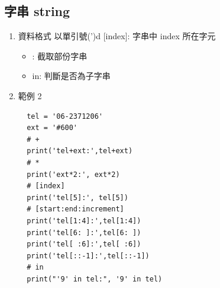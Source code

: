 \documentclass[a4paper,12pt]{article}
\begin{document}
\subsection{字串 string}
\label{sec:orga0fc341}
\begin{enumerate}
\item 資料格式
\label{sec:org3f5cb00}
以單引號(')d [index]: 字串中 index 所在字元\\
\begin{itemize}
\item{}: 截取部份字串\\
\item in: 判斷是否為子字串\\
\end{itemize}
\item 範例 2
\label{sec:org8850a1b}
\lstset{breaklines=true,language=Python,label= ,caption= ,captionpos=b,firstnumber=1,numbers=left}
\begin{lstlisting}
  tel = '06-2371206'
  ext = '#600'
  # +
  print('tel+ext:',tel+ext)
  # *
  print('ext*2:', ext*2)
  # [index]
  print('tel[5]:', tel[5])
  # [start:end:increment]
  print('tel[1:4]:',tel[1:4])
  print('tel[6: ]:',tel[6: ])
  print('tel[ :6]:',tel[ :6])
  print('tel[::-1]:',tel[::-1])
  # in
  print("'9' in tel:", '9' in tel)
\end{lstlisting}


\end{enumerate}
\end{document}

